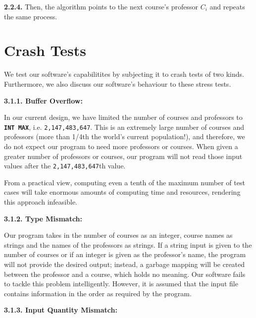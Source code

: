 \documentclass{article}
\begin{document}
    \bigskip
    
    \textbf{2.2.4.} Then, the algorithm points to the next course's professor \texttt{\textbf{$C_i$}} and repeats the same process.

\section{Crash Tests}

We test our software's capabilitites by subjecting it to crash tests of two kinds. Furthermore, we also discuss our software's behaviour to these stress tests.

\bigskip

    \textbf{3.1.1. Buffer Overflow:}

    \bigskip

        In our current design, we have limited the number of courses and professors to \texttt{\textbf{INT MAX}}, i.e. \texttt{2,147,483,647}. This is an extremely large number of courses and professors (more than 1/4th the world's current population!), and therefore, we do not expect our program to need more professors or courses. When given a greater number of professors or courses, our program will not read those input values after the \texttt{2,147,483,647}th value.

\bigskip

        From a practical view, computing even a tenth of the maximum number of test cases will take enormous amounts of computing time and resources, rendering this approach infeasible.

        \bigskip

    \textbf{3.1.2. Type Mismatch:}

    \bigskip

        Our program takes in the number of courses as an integer, course names as strings and the names of the professors as strings. If a string input is given to the number of courses or if an integer is given as the professor's name, the program will not provide the desired output; instead, a garbage mapping will be created between the professor and a course, which holds no meaning. Our software fails to tackle this problem intelligently. However, it is assumed that the input file contains information in the order as required by the program.

        \bigskip

    \textbf{3.1.3. Input Quantity Mismatch:}

    \bigskip
\end{document}

